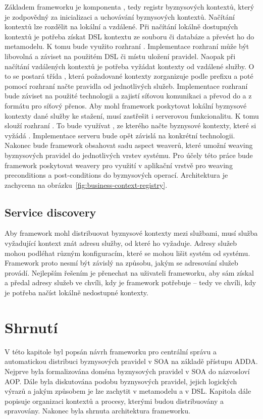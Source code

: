 Základem frameworku je komponenta , tedy registr
byznysových kontextů, který je zodpovědný za inicializaci a uchovávání byznysových kontextů.
Načítání kontextů lze rozdělit na lokální a vzdálené. Při načítání lokálně dostupných kontextů
je potřeba získat \gls{DSL} kontextu ze souboru či databáze a převést ho do metamodelu.
K tomu bude využito rozhraní . Implementace rozhraní může být libovolná
a záviset na použitém \gls{DSL} či místu uložení pravidel. Naopak při načítání vzdálených
kontextů je potřeba vyžádat kontexty od vzdálené služby. O to se postará třída ,
která požadované kontexty zorganizuje podle prefixu a poté pomocí rozhraní  načte
pravidla od jednotlivých služeb. Implementace rozhraní  bude záviset na použité
technologii a zajistí síťovou komunikaci a převod do a z formátu pro síťový přenos.
Aby mohl framework poskytovat lokální byznysové kontexty dané služby ke stažení, musí zastřešit
i serverovou funkcionalitu. K tomu slouží rozhraní . To bude využívat
, ze kterého načte byznysové kontexty, které si vyžádá .
Implementace serveru bude opět závislá na konkrétní technologii.
Nakonec bude framework obsahovat sadu aspect weaverů, které umožní weaving byznysových pravidel do
jednotlivých vrstev systému. Pro účely této práce bude framework poskytovat weavery pro využití v
aplikační vrstvě pro weaving preconditions a post-conditions do byznysových operací.
Architektura je zachycena na obrázku~\ref{fig:business-context-registry}.

\subsection{Service discovery}

Aby framework mohl distribuovat byznysové kontexty mezi službami, musí služba vyžadující kontext
znát adresu služby, od které ho vyžaduje. Adresy služeb mohou podléhat různým konfiguracím,
které se mohou lišit systém od systému. Framework proto nesmí být závislý na způsobu,
jakým se adresování služeb provádí. Nejlepším řešením je přenechat na uživateli frameworku, aby sám
získal a předal adresy služeb ve chvíli, kdy je framework potřebuje -- tedy
ve chvíli, kdy je potřeba načíst lokálně nedostupné kontexty.

\section{Shrnutí}

V této kapitole byl popsán návrh frameworku pro centrální správu a automatickou distribuci
byznysových pravidel v \gls{SOA} na základě přístupu \gls{ADDA}. Nejprve byla formalizována
doména byznysových pravidel v \gls{SOA} do názvosloví \gls{AOP}. Dále byla diskutována podobu byznysových pravidel,
jejich logických výrazů a jakým způsobem je lze zachytit v metamodelu a v \gls{DSL}.
Kapitola dále popisuje organizaci kontextů a procesy, kterými budou distribuovány a spravovány.
Nakonec byla shrnuta architektura frameworku.
